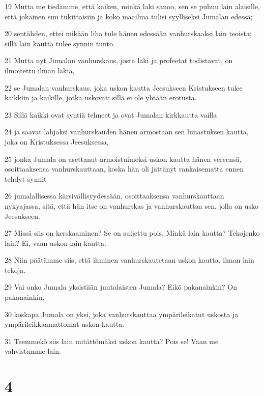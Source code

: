 \par 19 Mutta me tiedämme, että kaiken, minkä laki sanoo, sen se puhuu lain alaisille, että jokainen suu tukittaisiin ja koko maailma tulisi syylliseksi Jumalan edessä;
\par 20 sentähden, ettei mikään liha tule hänen edessään vanhurskaaksi lain teoista; sillä lain kautta tulee synnin tunto.
\par 21 Mutta nyt Jumalan vanhurskaus, josta laki ja profeetat todistavat, on ilmoitettu ilman lakia,
\par 22 se Jumalan vanhurskaus, joka uskon kautta Jeesukseen Kristukseen tulee kaikkiin ja kaikille, jotka uskovat; sillä ei ole yhtään erotusta.
\par 23 Sillä kaikki ovat syntiä tehneet ja ovat Jumalan kirkkautta vailla
\par 24 ja saavat lahjaksi vanhurskauden hänen armostaan sen lunastuksen kautta, joka on Kristuksessa Jeesuksessa,
\par 25 jonka Jumala on asettanut armoistuimeksi uskon kautta hänen vereensä, osoittaaksensa vanhurskauttaan, koska hän oli jättänyt rankaisematta ennen tehdyt synnit
\par 26 jumalallisessa kärsivällisyydessään, osoittaaksensa vanhurskauttaan nykyajassa, sitä, että hän itse on vanhurskas ja vanhurskauttaa sen, jolla on usko Jeesukseen.
\par 27 Missä siis on kerskaaminen? Se on suljettu pois. Minkä lain kautta? Tekojenko lain? Ei, vaan uskon lain kautta.
\par 28 Niin päätämme siis, että ihminen vanhurskautetaan uskon kautta, ilman lain tekoja.
\par 29 Vai onko Jumala yksistään juutalaisten Jumala? Eikö pakanainkin? On pakanainkin,
\par 30 koskapa Jumala on yksi, joka vanhurskauttaa ympärileikatut uskosta ja ympärileikkaamattomat uskon kautta.
\par 31 Teemmekö siis lain mitättömäksi uskon kautta? Pois se! Vaan me vahvistamme lain.

\chapter{4}

